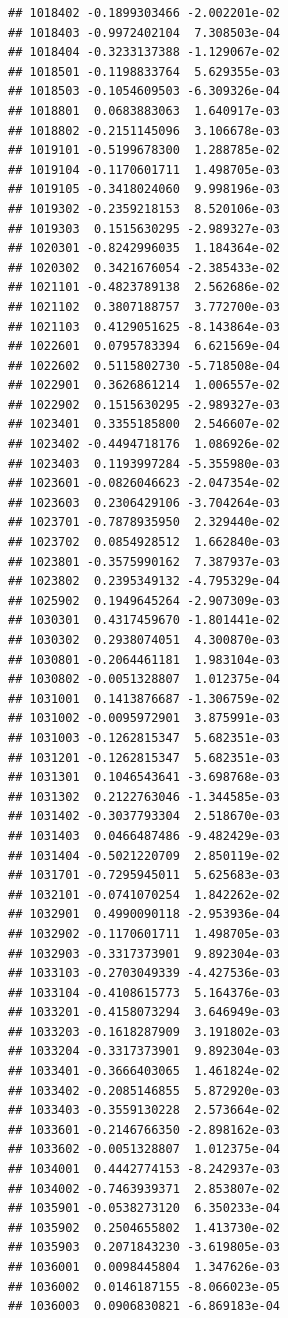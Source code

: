 \documentclass[ignorenonframetext,]{beamer}
\begin{document}
\begin{frame}[fragile]
\begin{verbatim}
## 1018402 -0.1899303466 -2.002201e-02
## 1018403 -0.9972402104  7.308503e-04
## 1018404 -0.3233137388 -1.129067e-02
## 1018501 -0.1198833764  5.629355e-03
## 1018503 -0.1054609503 -6.309326e-04
## 1018801  0.0683883063  1.640917e-03
## 1018802 -0.2151145096  3.106678e-03
## 1019101 -0.5199678300  1.288785e-02
## 1019104 -0.1170601711  1.498705e-03
## 1019105 -0.3418024060  9.998196e-03
## 1019302 -0.2359218153  8.520106e-03
## 1019303  0.1515630295 -2.989327e-03
## 1020301 -0.8242996035  1.184364e-02
## 1020302  0.3421676054 -2.385433e-02
## 1021101 -0.4823789138  2.562686e-02
## 1021102  0.3807188757  3.772700e-03
## 1021103  0.4129051625 -8.143864e-03
## 1022601  0.0795783394  6.621569e-04
## 1022602  0.5115802730 -5.718508e-04
## 1022901  0.3626861214  1.006557e-02
## 1022902  0.1515630295 -2.989327e-03
## 1023401  0.3355185800  2.546607e-02
## 1023402 -0.4494718176  1.086926e-02
## 1023403  0.1193997284 -5.355980e-03
## 1023601 -0.0826046623 -2.047354e-02
## 1023603  0.2306429106 -3.704264e-03
## 1023701 -0.7878935950  2.329440e-02
## 1023702  0.0854928512  1.662840e-03
## 1023801 -0.3575990162  7.387937e-03
## 1023802  0.2395349132 -4.795329e-04
## 1025902  0.1949645264 -2.907309e-03
## 1030301  0.4317459670 -1.801441e-02
## 1030302  0.2938074051  4.300870e-03
## 1030801 -0.2064461181  1.983104e-03
## 1030802 -0.0051328807  1.012375e-04
## 1031001  0.1413876687 -1.306759e-02
## 1031002 -0.0095972901  3.875991e-03
## 1031003 -0.1262815347  5.682351e-03
## 1031201 -0.1262815347  5.682351e-03
## 1031301  0.1046543641 -3.698768e-03
## 1031302  0.2122763046 -1.344585e-03
## 1031402 -0.3037793304  2.518670e-03
## 1031403  0.0466487486 -9.482429e-03
## 1031404 -0.5021220709  2.850119e-02
## 1031701 -0.7295945011  5.625683e-03
## 1032101 -0.0741070254  1.842262e-02
## 1032901  0.4990090118 -2.953936e-04
## 1032902 -0.1170601711  1.498705e-03
## 1032903 -0.3317373901  9.892304e-03
## 1033103 -0.2703049339 -4.427536e-03
## 1033104 -0.4108615773  5.164376e-03
## 1033201 -0.4158073294  3.646949e-03
## 1033203 -0.1618287909  3.191802e-03
## 1033204 -0.3317373901  9.892304e-03
## 1033401 -0.3666403065  1.461824e-02
## 1033402 -0.2085146855  5.872920e-03
## 1033403 -0.3559130228  2.573664e-02
## 1033601 -0.2146766350 -2.898162e-03
## 1033602 -0.0051328807  1.012375e-04
## 1034001  0.4442774153 -8.242937e-03
## 1034002 -0.7463939371  2.853807e-02
## 1035901 -0.0538273120  6.350233e-04
## 1035902  0.2504655802  1.413730e-02
## 1035903  0.2071843230 -3.619805e-03
## 1036001  0.0098445804  1.347626e-03
## 1036002  0.0146187155 -8.066023e-05
## 1036003  0.0906830821 -6.869183e-04

\end{verbatim}
\end{frame}
\end{document}
